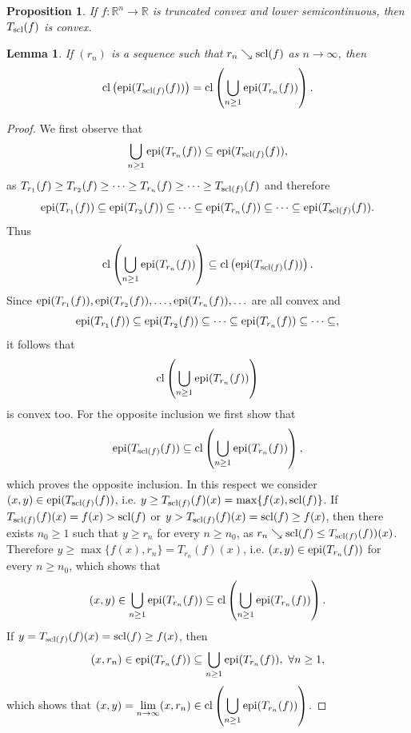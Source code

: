 \documentclass[12pt,twoside,reqno]{amsart}
\newtheorem{lemma}{Lemma}[section]
\newtheorem{proposition}{Proposition}[section]
\theoremstyle{definition}
\numberwithin{equation}{section}
\begin{document}
\begin{proposition}\label{theSCLachived}
If $f:\mathbb{R}^n\longrightarrow\mathbb{R}$ is truncated convex and lower semicontinuous, then $T_{\rm scl}(f)$ is convex.
\end{proposition}
\begin{lemma}
If $(r_n)$ is a sequence such that $r_n\searrow {\rm scl}(f)$ as $n\longrightarrow\infty$, then 
\begin{equation}
{\rm cl}\left({\rm epi}(T_{{\rm scl}(f)}(f))\right)={\rm cl}\left(\displaystyle\bigcup_{n\geq 1}{\rm epi}(T_{r_n}(f))\right).
\end{equation}
\end{lemma}
\begin{proof}
We first observe that 
\[
\displaystyle\bigcup_{n\geq 1}{\rm epi}(T_{r_n}(f))\subseteq {\rm epi}(T_{{\rm scl}(f)}(f)), 
\]
as $T_{r_1}(f)\geq T_{r_2}(f)\geq \cdots\geq T_{r_n}(f)\geq \cdots\geq T_{{\rm scl}(f)}(f)$ and
therefore
\begin{equation}\label{asofepi}
{\rm epi}(T_{r_1}(f))\subseteq  {\rm epi}(T_{r_2}(f))\subseteq\cdots\subseteq  {\rm epi}(T_{r_n}(f))\subseteq \cdots\subseteq {\rm epi}(T_{{\rm scl}(f)}(f)).
\end{equation}
Thus
\begin{equation}\label{inclofclepi}
{\rm cl}\left(\displaystyle\bigcup_{n\geq 1}{\rm epi}(T_{r_n}(f))\right)\subseteq {\rm cl}\left({\rm epi}(T_{{\rm scl}(f)}(f))\right).
\end{equation}
Since  ${\rm epi}(T_{r_1}(f)),  {\rm epi}(T_{r_2}(f)),\ldots,  {\rm epi}(T_{r_n}(f)), \ldots$ are all convex and 
\[
{\rm epi}(T_{r_1}(f))\subseteq  {\rm epi}(T_{r_2}(f))\subseteq\cdots\subseteq  {\rm epi}(T_{r_n}(f))\subseteq \cdots\subseteq,   
\]
it follows that 
\[{\rm cl}\left(\displaystyle\bigcup_{n\geq 1}{\rm epi}(T_{r_n}(f))\right)\] is convex too. For the opposite inclusion we first show that
\begin{equation}\label{inclofclepi-1}
{\rm epi}(T_{{\rm scl}(f)}(f))\subseteq{\rm cl}\left(\displaystyle\bigcup_{n\geq 1}{\rm epi}(T_{r_n}(f))\right),
\end{equation}
which proves the opposite inclusion. In this respect we consider $(x,y)\in {\rm epi}(T_{{\rm scl}(f)}(f))$, i.e. 
$y\geq T_{{\rm scl}(f)}(f)(x)=\max\{f(x),{\rm scl}(f)\}$. If $T_{{\rm scl}(f)}(f)(x)=f(x)>{\rm scl}(f)$ or $y>T_{{\rm scl}(f)}(f)(x)={\rm scl}(f)\geq f(x)$,
then there exists $n_0\geq 1$ such that $y\geq r_n$ for every $n\geq n_0$, as $r_n\searrow {\rm scl}(f)\leq T_{{\rm scl}(f)}(f))(x)$.
Therefore $y\geq\max\{f(x),r_n\}=T_{r_n}(f)(x)$, i.e. $(x,y)\in {\rm epi}(T_{r_n}(f))$ for every $n\geq n_0$, which shows that 
\[(x,y)\in\displaystyle\bigcup_{n\geq 1}{\rm epi}(T_{r_n}(f))\subseteq {\rm cl}\left(\displaystyle\bigcup_{n\geq 1}{\rm epi}(T_{r_n}(f))\right).\]
If $y=T_{{\rm scl}(f)}(f)(x)={\rm scl}(f)\geq f(x)$, then 
\[
(x,r_n)\in {\rm epi}(T_{r_n}(f))\subseteq  \displaystyle\bigcup_{n\geq 1}{\rm epi}(T_{r_n}(f)), \ \forall n\geq 1,
\]
which shows that $(x,y)=\displaystyle\lim_{n\rightarrow\infty}(x,r_n)\in {\rm cl}\left(\displaystyle\bigcup_{n\geq 1}{\rm epi}(T_{r_n}(f))\right)$.
\end{proof}
\end{document}
